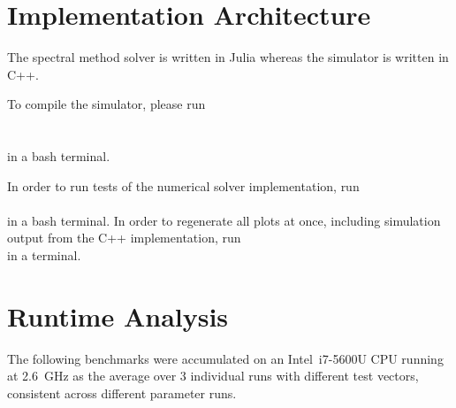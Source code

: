 \section{Implementation Architecture}
The spectral method solver is written in Julia \parencite{2017-julia} whereas the simulator is written in C++.

To compile the simulator, please run \\
 \\
 \\
in a bash terminal.

In order to run tests of the numerical solver implementation, run \\
 \\
in a bash terminal. In order to regenerate all plots at once, including simulation output from the C++ implementation, run \\
in a terminal.

\hierKoennteIhreWerbungStehen

\section{Runtime Analysis}
The following benchmarks were accumulated on an Intel\textregistered \, i7-5600U CPU running at \SI{2.6}{\giga\hertz} as the average over 3 individual runs with different test vectors, consistent across different parameter runs.
\hierKoennteIhreWerbungStehen
